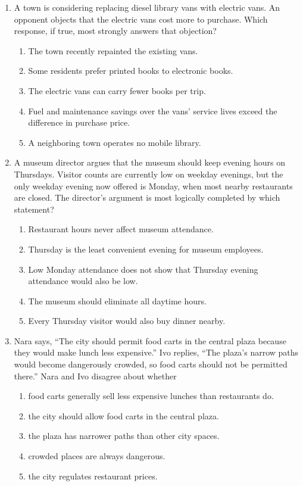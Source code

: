 \begin{enumerate}

\item A town is considering replacing diesel library vans with electric vans.
An opponent objects that the electric vans cost more to purchase. Which response,
if true, most strongly answers that objection?
  \begin{enumerate}
  \item The town recently repainted the existing vans.
  \item Some residents prefer printed books to electronic books.
  \item The electric vans can carry fewer books per trip.
  \item Fuel and maintenance savings over the vans' service lives exceed the
        difference in purchase price.
  \item A neighboring town operates no mobile library.
  \end{enumerate}

\item A museum director argues that the museum should keep evening hours on
Thursdays. Visitor counts are currently low on weekday evenings, but the only
weekday evening now offered is Monday, when most nearby restaurants are closed.
The director's argument is most logically completed by which statement?
  \begin{enumerate}
  \item Restaurant hours never affect museum attendance.
  \item Thursday is the least convenient evening for museum employees.
  \item Low Monday attendance does not show that Thursday evening attendance
        would also be low.
  \item The museum should eliminate all daytime hours.
  \item Every Thursday visitor would also buy dinner nearby.
  \end{enumerate}

\item Nara says, ``The city should permit food carts in the central plaza because
they would make lunch less expensive.'' Ivo replies, ``The plaza's narrow paths
would become dangerously crowded, so food carts should not be permitted there.''
Nara and Ivo disagree about whether
  \begin{enumerate}
  \item food carts generally sell less expensive lunches than restaurants do.
  \item the city should allow food carts in the central plaza.
  \item the plaza has narrower paths than other city spaces.
  \item crowded places are always dangerous.
  \item the city regulates restaurant prices.
  \end{enumerate}


\end{enumerate}
